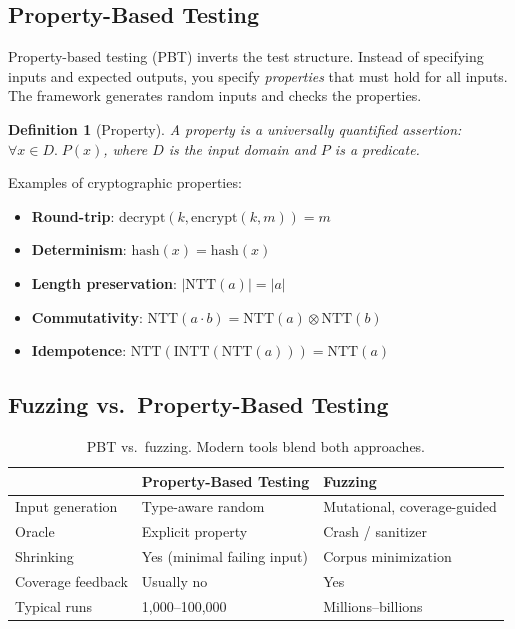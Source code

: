 \documentclass[11pt,a4paper]{article}
\newtheorem{definition}{Definition}
\begin{document}
\subsection{Property-Based Testing}

Property-based testing (PBT) inverts the test structure. Instead of specifying inputs
and expected outputs, you specify \emph{properties} that must hold for all inputs. The
framework generates random inputs and checks the properties.

\begin{definition}[Property]
A property is a universally quantified assertion: $\forall x \in D.\; P(x)$, where $D$
is the input domain and $P$ is a predicate.
\end{definition}

Examples of cryptographic properties:
\begin{itemize}[nosep]
  \item \textbf{Round-trip}: $\text{decrypt}(k, \text{encrypt}(k, m)) = m$
  \item \textbf{Determinism}: $\text{hash}(x) = \text{hash}(x)$
  \item \textbf{Length preservation}: $|\text{NTT}(a)| = |a|$
  \item \textbf{Commutativity}: $\text{NTT}(a \cdot b) = \text{NTT}(a) \otimes \text{NTT}(b)$
  \item \textbf{Idempotence}: $\text{NTT}(\text{INTT}(\text{NTT}(a))) = \text{NTT}(a)$
\end{itemize}

\subsection{Fuzzing vs.\ Property-Based Testing}

\begin{table}[H]
\centering
\small
\begin{tabular}{@{}lll@{}}
\toprule
 & \textbf{Property-Based Testing} & \textbf{Fuzzing} \\
\midrule
Input generation & Type-aware random & Mutational, coverage-guided \\
Oracle & Explicit property & Crash / sanitizer \\
Shrinking & Yes (minimal failing input) & Corpus minimization \\
Coverage feedback & Usually no & Yes \\
Typical runs & 1,000--100,000 & Millions--billions \\
\bottomrule
\end{tabular}
\caption{PBT vs.\ fuzzing. Modern tools blend both approaches.}
\end{table}
\end{document}
